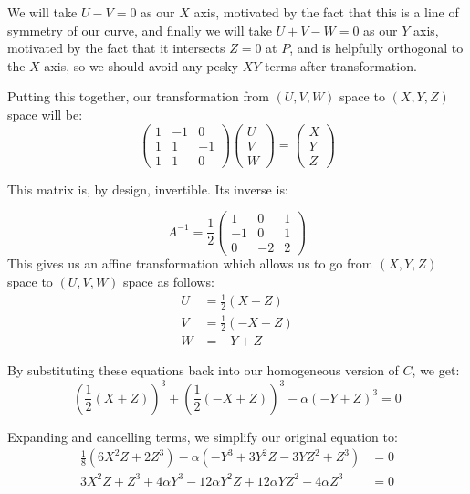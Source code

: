 \documentclass{article}
\begin{document}
We will take $U-V=0$ as our $X$ axis, motivated by the fact that this is a line of symmetry
of our curve, and finally we will take $U+V-W = 0$ as our $Y$ axis, motivated by the fact
that it intersects $Z=0$ at $P$, and is helpfully orthogonal to the $X$ axis, so we should
avoid any pesky $XY$ terms after transformation.

Putting this together, our transformation from $(U,V,W)$ space to $(X,Y,Z)$ space will be:
\[ 
\begin{pmatrix} 1 & -1 & 0 \\ 1 & 1 & -1 \\ 1 & 1 & 0 \end{pmatrix}
\begin{pmatrix} U \\ V \\ W \end{pmatrix} = 
\begin{pmatrix} X \\ Y \\ Z \end{pmatrix} \]

This matrix is, by design, invertible. Its inverse is:

\[ A^{-1} = \frac{1}{2} \begin{pmatrix} 1 & 0 & 1 \\ -1 & 0 & 1 \\ 0 & -2 & 2 \end{pmatrix} \]
This gives us an affine transformation which allows us to go from $(X,Y,Z)$ space to $(U,V,W)$ space as follows:
\begin{equation*}
\begin{split}
    U &= \frac{1}{2}(X + Z) \\
    V &= \frac{1}{2}(-X + Z) \\
    W  &= -Y + Z
\end{split}
\end{equation*}

By substituting these equations back into our homogeneous version of $C$, we get:
\[ \left(\frac{1}{2}(X + Z)\right)^3 + \left(\frac{1}{2}(-X + Z)\right)^3
- \alpha\left(-Y + Z\right)^3 = 0 \]

Expanding and cancelling terms, we simplify our original equation to:
\begin{equation*}
\begin{split}
     \frac{1}{8}(6X^2Z + 2Z^3) - \alpha (-Y^3 + 3Y^2Z - 3YZ^2 + Z^3) &= 0 \\
     3X^2Z + Z^3 + 4 \alpha Y^3 - 12 \alpha Y^2Z + 12\alpha YZ^2 - 4\alpha Z^3 &= 0 
\end{split}
\end{equation*}
\end{document}
